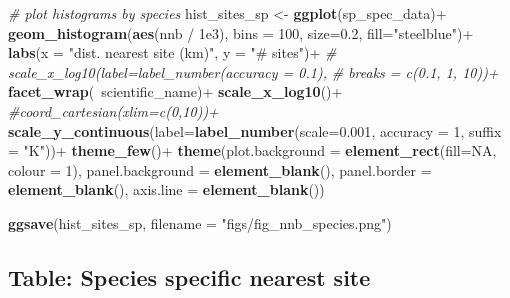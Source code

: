 \documentclass[]{article}
\newenvironment{Shaded}{}{}
\newcommand{\CommentTok}[1]{\textcolor[rgb]{0.38,0.63,0.69}{\textit{#1}}}
\newcommand{\DataTypeTok}[1]{\textcolor[rgb]{0.56,0.13,0.00}{#1}}
\newcommand{\DecValTok}[1]{\textcolor[rgb]{0.25,0.63,0.44}{#1}}
\newcommand{\FloatTok}[1]{\textcolor[rgb]{0.25,0.63,0.44}{#1}}
\newcommand{\KeywordTok}[1]{\textcolor[rgb]{0.00,0.44,0.13}{\textbf{#1}}}
\newcommand{\NormalTok}[1]{#1}
\newcommand{\OperatorTok}[1]{\textcolor[rgb]{0.40,0.40,0.40}{#1}}
\newcommand{\OtherTok}[1]{\textcolor[rgb]{0.00,0.44,0.13}{#1}}
\newcommand{\StringTok}[1]{\textcolor[rgb]{0.25,0.44,0.63}{#1}}
\begin{document}
\begin{Shaded}
\begin{Highlighting}[]
\CommentTok{# plot histograms by species}
\NormalTok{hist_sites_sp <-}\StringTok{ }
\StringTok{  }\KeywordTok{ggplot}\NormalTok{(sp_spec_data)}\OperatorTok{+}
\StringTok{  }\KeywordTok{geom_histogram}\NormalTok{(}\KeywordTok{aes}\NormalTok{(nnb }\OperatorTok{/}\StringTok{ }\FloatTok{1e3}\NormalTok{),}
                 \DataTypeTok{bins =} \DecValTok{100}\NormalTok{, }\DataTypeTok{size=}\FloatTok{0.2}\NormalTok{, }\DataTypeTok{fill=}\StringTok{"steelblue"}\NormalTok{)}\OperatorTok{+}
\StringTok{  }\KeywordTok{labs}\NormalTok{(}\DataTypeTok{x =} \StringTok{"dist. nearest site (km)"}\NormalTok{, }\DataTypeTok{y =} \StringTok{"# sites"}\NormalTok{)}\OperatorTok{+}
\StringTok{  }\CommentTok{# scale_x_log10(label=label_number(accuracy = 0.1), }
\StringTok{  }\CommentTok{#               breaks = c(0.1, 1, 10))+}
\StringTok{  }\KeywordTok{facet_wrap}\NormalTok{(}\OperatorTok{~}\NormalTok{scientific_name)}\OperatorTok{+}
\StringTok{  }\KeywordTok{scale_x_log10}\NormalTok{()}\OperatorTok{+}
\StringTok{  }\CommentTok{#coord_cartesian(xlim=c(0,10))+}
\StringTok{  }\KeywordTok{scale_y_continuous}\NormalTok{(}\DataTypeTok{label=}\KeywordTok{label_number}\NormalTok{(}\DataTypeTok{scale=}\FloatTok{0.001}\NormalTok{, }\DataTypeTok{accuracy =} \DecValTok{1}\NormalTok{, }\DataTypeTok{suffix =} \StringTok{"K"}\NormalTok{))}\OperatorTok{+}
\StringTok{  }\KeywordTok{theme_few}\NormalTok{()}\OperatorTok{+}
\StringTok{  }\KeywordTok{theme}\NormalTok{(}\DataTypeTok{plot.background =} \KeywordTok{element_rect}\NormalTok{(}\DataTypeTok{fill=}\OtherTok{NA}\NormalTok{, }\DataTypeTok{colour =} \DecValTok{1}\NormalTok{),}
        \DataTypeTok{panel.background =} \KeywordTok{element_blank}\NormalTok{(),}
        \DataTypeTok{panel.border =} \KeywordTok{element_blank}\NormalTok{(), }\DataTypeTok{axis.line =} \KeywordTok{element_blank}\NormalTok{())}

\KeywordTok{ggsave}\NormalTok{(hist_sites_sp, }\DataTypeTok{filename =} \StringTok{"figs/fig_nnb_species.png"}\NormalTok{)}
\end{Highlighting}
\end{Shaded}

\hypertarget{table-species-specific-nearest-site}{%
\subsection{Table: Species specific nearest site}\label{table-species-specific-nearest-site}}
\end{document}
